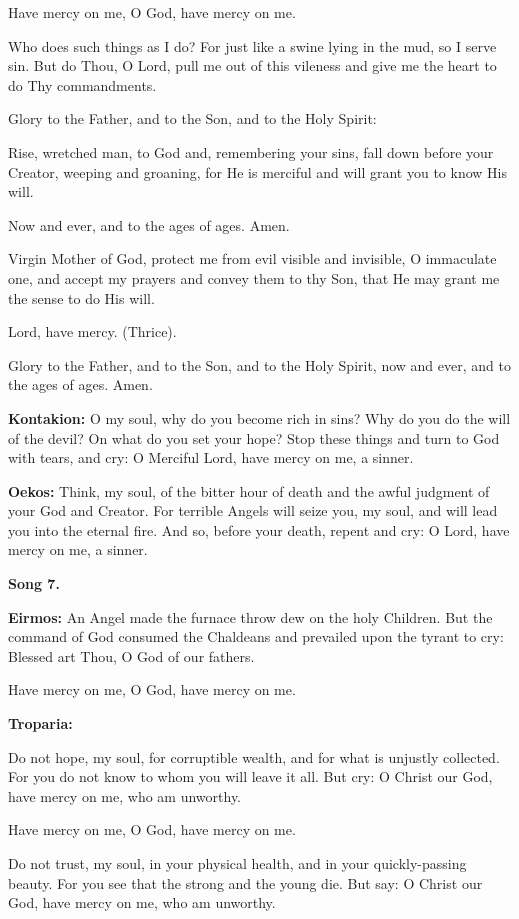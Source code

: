 Have mercy on me, O God, have mercy on me.

Who does such things as I do? For just like a swine lying in the mud, so
I serve sin. But do Thou, O Lord, pull me out of this vileness and give
me the heart to do Thy commandments.

Glory to the Father, and to the Son, and to the Holy Spirit:

Rise, wretched man, to God and, remembering your sins, fall down before
your Creator, weeping and groaning, for He is merciful and will grant
you to know His will.

Now and ever, and to the ages of ages. Amen.

Virgin Mother of God, protect me from evil visible and invisible, O
immaculate one, and accept my prayers and convey them to thy Son, that
He may grant me the sense to do His will.

Lord, have mercy. (Thrice).

Glory to the Father, and to the Son, and to the Holy Spirit, now and
ever, and to the ages of ages. Amen.

\textbf{Kontakion:} O my soul, why do you become rich in sins? Why do
you do the will of the devil? On what do you set your hope? Stop these
things and turn to God with tears, and cry: O Merciful Lord, have mercy
on me, a sinner.

\textbf{Oekos:} Think, my soul, of the bitter hour of death and the
awful judgment of your God and Creator. For terrible Angels will seize
you, my soul, and will lead you into the eternal fire. And so, before
your death, repent and cry: O Lord, have mercy on me, a sinner.

\textbf{Song 7.}

\textbf{Eirmos:} An Angel made the furnace throw dew on the holy
Children. But the command of God consumed the Chaldeans and prevailed
upon the tyrant to cry: Blessed art Thou, O God of our fathers.

Have mercy on me, O God, have mercy on me.

\textbf{Troparia:}

Do not hope, my soul, for corruptible wealth, and for what is unjustly
collected. For you do not know to whom you will leave it all. But cry: O
Christ our God, have mercy on me, who am unworthy.

Have mercy on me, O God, have mercy on me.

Do not trust, my soul, in your physical health, and in your
quickly-passing beauty. For you see that the strong and the young die.
But say: O Christ our God, have mercy on me, who am unworthy.

